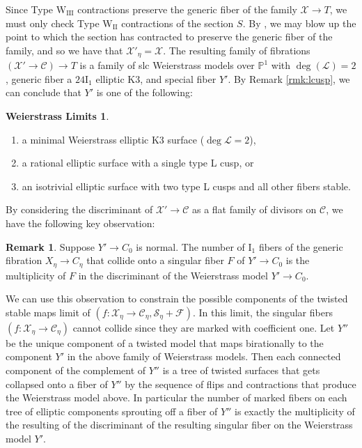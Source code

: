 \documentclass[11pt]{amsart}
\theoremstyle{definition}
\newtheorem{remark}[theorem]{Remark}
\newtheorem*{list1}{Weierstrass Limits}
\theoremstyle{remark}
\begin{document}
	Since Type $\mathrm{W}_\mathrm{III}$ contractions preserve the generic fiber of the family $\mathscr{X} \to T$, we must only check Type $\mathrm{W}_\mathrm{II}$ contractions of the section $S$. By \cite[Proposition 5.9]{giovanni}, we may blow up the point to which the section has contracted to preserve the generic fiber of the family, and so  we have that $\mathscr{X}'_\eta = \mathscr{X}$. The resulting family of fibrations $(\mathscr{X}' \to \mathscr{C}) \to T$ is a family of slc Weierstrass models over $\mathbb{P}^1$ with $\deg(\mathscr{L}) = 2$, generic fiber a $24\mathrm{I}_1$ elliptic K3, and special fiber $Y'$. By Remark \ref{rmk:lcusp}, we can conclude that $Y'$ is one of the following:
	\begin{list1}\leavevmode
		\begin{enumerate}
			\item a minimal Weierstrass elliptic K3 surface ($\deg\mathscr{L} = 2$), 
			\item a rational elliptic surface with a single type L cusp, or
			\item an isotrivial elliptic surface with two type L cusps and all other fibers stable. 
		\end{enumerate}
	\end{list1}
	
	
	By considering the discriminant of $\mathscr{X}' \to \mathscr{C}$ as a flat family of divisors on $\mathscr{C}$, we have the following key observation: 
	
	\begin{remark}\label{obs1} Suppose $Y' \to C_0$ is normal. The number of $\mathrm{I}_1$ fibers of the generic fibration $X_\eta \to C_\eta$ that collide onto a singular fiber $F$ of $Y' \to C_0$ is the multiplicity of $F$ in the discriminant of the Weierstrass model $Y' \to C_0$. \end{remark} 
	
	We can use this observation to constrain the possible components of the twisted stable maps limit of $(f : \mathscr{X}_\eta \to \mathscr{C}_\eta, \mathscr{S}_\eta + \mathscr{F})$. In this limit, the singular fibers $(f : \mathscr{X}_\eta \to \mathscr{C}_\eta)$ cannot collide since they are marked with coefficient one. Let $Y''$ be the unique component of a twisted model that maps birationally to the component $Y'$ in the above family of Weierstrass models. Then each connected component of the complement of $Y''$ is a tree of twisted surfaces that gets collapsed onto a fiber of $Y''$ by the sequence of flips and contractions that produce the Weierstrass model above. In particular the number of marked fibers on each tree of elliptic components sprouting off a fiber of $Y''$ is exactly the multiplicity of the resulting of the discriminant of the resulting singular fiber on the Weierstrass model $Y'$. 
	
\end{document}
